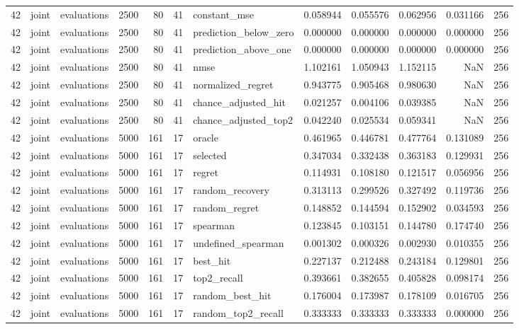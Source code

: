 \begin{tabular}{rllrrrlrrrrr}
42 & joint & evaluations & 2500 & 80 & 41 & constant_mse & 0.058944 & 0.055576 & 0.062956 & 0.031166 & 256 \\
42 & joint & evaluations & 2500 & 80 & 41 & prediction_below_zero & 0.000000 & 0.000000 & 0.000000 & 0.000000 & 256 \\
42 & joint & evaluations & 2500 & 80 & 41 & prediction_above_one & 0.000000 & 0.000000 & 0.000000 & 0.000000 & 256 \\
42 & joint & evaluations & 2500 & 80 & 41 & nmse & 1.102161 & 1.050943 & 1.152115 & NaN & 256 \\
42 & joint & evaluations & 2500 & 80 & 41 & normalized_regret & 0.943775 & 0.905468 & 0.980630 & NaN & 256 \\
42 & joint & evaluations & 2500 & 80 & 41 & chance_adjusted_hit & 0.021257 & 0.004106 & 0.039385 & NaN & 256 \\
42 & joint & evaluations & 2500 & 80 & 41 & chance_adjusted_top2 & 0.042240 & 0.025534 & 0.059341 & NaN & 256 \\
42 & joint & evaluations & 5000 & 161 & 17 & oracle & 0.461965 & 0.446781 & 0.477764 & 0.131089 & 256 \\
42 & joint & evaluations & 5000 & 161 & 17 & selected & 0.347034 & 0.332438 & 0.363183 & 0.129931 & 256 \\
42 & joint & evaluations & 5000 & 161 & 17 & regret & 0.114931 & 0.108180 & 0.121517 & 0.056956 & 256 \\
42 & joint & evaluations & 5000 & 161 & 17 & random_recovery & 0.313113 & 0.299526 & 0.327492 & 0.119736 & 256 \\
42 & joint & evaluations & 5000 & 161 & 17 & random_regret & 0.148852 & 0.144594 & 0.152902 & 0.034593 & 256 \\
42 & joint & evaluations & 5000 & 161 & 17 & spearman & 0.123845 & 0.103151 & 0.144780 & 0.174740 & 256 \\
42 & joint & evaluations & 5000 & 161 & 17 & undefined_spearman & 0.001302 & 0.000326 & 0.002930 & 0.010355 & 256 \\
42 & joint & evaluations & 5000 & 161 & 17 & best_hit & 0.227137 & 0.212488 & 0.243184 & 0.129801 & 256 \\
42 & joint & evaluations & 5000 & 161 & 17 & top2_recall & 0.393661 & 0.382655 & 0.405828 & 0.098174 & 256 \\
42 & joint & evaluations & 5000 & 161 & 17 & random_best_hit & 0.176004 & 0.173987 & 0.178109 & 0.016705 & 256 \\
42 & joint & evaluations & 5000 & 161 & 17 & random_top2_recall & 0.333333 & 0.333333 & 0.333333 & 0.000000 & 256 \\

\end{tabular}
